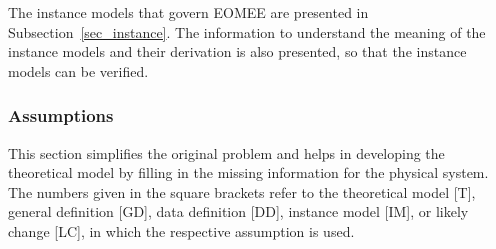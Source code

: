 \documentclass[12pt]{article}
\begin{document}
The instance models that govern EOMEE are presented in
Subsection~\ref{sec_instance}.  The information to understand the meaning of the
instance models and their derivation is also presented, so that the instance
models can be verified.

\subsubsection{Assumptions} \label{sec_assumpt}


This section simplifies the original problem and helps in developing the
theoretical model by filling in the missing information for the physical
system. The numbers given in the square brackets refer to the theoretical model
[T], general definition [GD], data definition [DD], instance model [IM], or
likely change [LC], in which the respective assumption is used.
\end{document}
